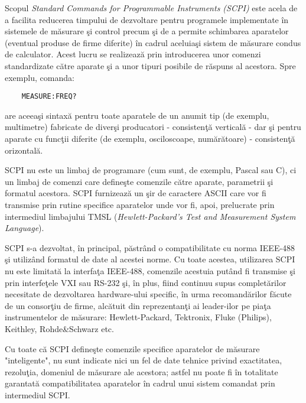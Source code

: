 Scopul \emph{Standard Commands for Programmable Instruments (SCPI)} este acela de a facilita reducerea timpului de dezvoltare pentru programele implementate \^{i}n sistemele de m\u{a}surare \c{s}i control precum \c{s}i de a permite schimbarea aparatelor (eventual produse de firme diferite) \^{i}n cadrul aceluia\c{s}i sistem de m\u{a}surare condus de calculator. Acest lucru se realizeaz\u{a} prin introducerea unor comenzi standardizate c\u{a}tre aparate \c{s}i a unor tipuri posibile de r\u{a}spuns al acestora. Spre exemplu, comanda:
\begin{center}
	\begin{verbatim}
	MEASURE:FREQ?
	\end{verbatim}
\end{center}

are aceea\c{s}i sintax\u{a} pentru toate aparatele de un anumit tip (de exemplu, multimetre) fabricate de diver\c{s}i producatori - consisten\c{t}\u{a} vertical\u{a} - dar \c{s}i pentru aparate cu func\c{t}ii diferite (de exemplu, osciloscoape, num\u{a}r\u{a}toare) - consisten\c{t}\u{a} orizontal\u{a}.

SCPI nu este un limbaj de programare (cum sunt, de exemplu, Pascal sau C), ci un limbaj de comenzi care define\c{s}te comenzile c\u{a}tre aparate, parametrii \c{s}i formatul acestora. SCPI furnizeaz\u{a} un \c{s}ir de caractere ASCII care vor fi transmise prin rutine specifice aparatelor unde vor fi, apoi, prelucrate prin intermediul limbajului TMSL (\emph{Hewlett-Packard's Test and Measurement System Language}).

SCPI s-a dezvoltat, \^{i}n principal, p\u{a}str\^{a}nd o compatibilitate cu norma IEEE-488 \c{s}i utiliz\^{a}nd formatul de date al acestei norme. Cu toate acestea, utilizarea SCPI nu este limitat\u{a} la interfa\c{t}a IEEE-488, comenzile acestuia put\^{a}nd fi transmise \c{s}i prin interfe\c{t}ele VXI sau RS-232 \c{s}i, \^{i}n plus, fiind continuu supus complet\u{a}rilor necesitate de dezvoltarea hardware-ului specific, \^{i}n urma recomand\u{a}rilor f\u{a}cute de un consor\c{t}iu de firme, alc\u{a}tuit din reprezentan\c{t}i ai leader-ilor pe pia\c{t}a instrumentelor de m\u{a}surare: Hewlett-Packard, Tektronix, Fluke (Philips), Keithley, Rohde\&Schwarz etc.

Cu toate c\u{a} SCPI define\c{s}te comenzile specifice aparatelor de m\u{a}surare "inteligente", nu sunt indicate nici un fel de date tehnice privind exactitatea, rezolu\c{t}ia, domeniul de m\u{a}surare ale acestora; astfel nu poate fi \^{i}n totalitate garantat\u{a} compatibilitatea aparatelor \^{i}n cadrul unui sistem comandat prin intermediul SCPI.

